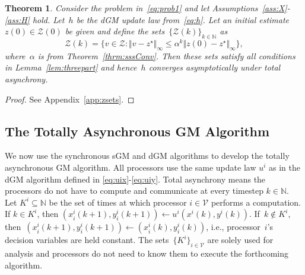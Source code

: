 \documentclass[9pt,shortpaper,twoside,web]{ieeecolor}
\newcommand{\Z}{\ensuremath{\mathcal{Z}}\xspace}
\newcommand{\V}{\ensuremath{\mathcal{V}}\xspace}
\newcommand{\blue}[1]{{\textcolor{blue}{#1}}}
\newtheorem{theorem}{Theorem}
\begin{document}
\begin{theorem} \label{thrm:asymptotic}
Consider the problem in~\eqref{eq:prob1} and let Assumptions~\ref{ass:X}-\ref{ass:H} hold. 
Let~$h$ be the dGM update law from~\eqref{eq:h}. 
Let an initial estimate~$z(0) \in \Z(0)$ be given and
define the sets~$\{\Z(k)\}_{k \in \mathbb{N}}$ as
    \begin{equation}\label{eq:Zk}
        \Z(k) = \{v\in \Z : \Vert v-z^\star\Vert_\infty \leq \alpha^k\Vert z(0)-z^\star\Vert_\infty\},
    \end{equation}
    where~$\alpha$ is from Theorem~\ref{thrm:sssConv}. 
    Then these sets satisfy all conditions in Lemma~\ref{lem:threepart} and hence~$h$
    converges asymptotically under total asynchrony. 
\end{theorem}

\begin{proof}
    See Appendix~\ref{app:zsets}. 
\end{proof}




\subsection{The Totally Asynchronous GM Algorithm}
We now use the synchronous sGM and dGM algorithms to develop the totally asynchronous GM algorithm. 
All processors use the same update law $u^i$ as in the dGM algorithm defined in \eqref{eq:uix}-\eqref{eq:uiy}.
Total asynchrony means the processors do not have to compute and communicate at every timestep $k\in\mathbb N$.
Let $K^i\subseteq \mathbb N$ be the set of times at which processor $i \in \V$ performs a computation.
If $k\in K^i$, then $(x^i_i(k+1),y^i_i(k+1))\gets u^i(x^i(k),y^i(k))$.
If~$k \not\in K^i$, then~$(x^i_i(k+1),y^i_i(k+1)) \gets (x^i_i(k),y^i_i(k))$, i.e., 
processor~$i$'s decision variables are held constant. 
The sets~$\{K^i\}_{i \in \V}$ are solely used for analysis and processors do not need to know them to execute
the forthcoming algorithm. 
\end{document}

